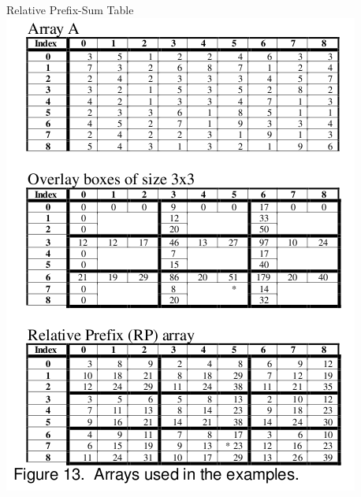 \documentclass{beamer}
\theoremstyle{definition}
\theoremstyle{definition}
\begin{document}
\begin{frame}{Relative Prefix-Sum Table}
\includegraphics[scale=0.35]{relprefix_tables.png}
\cite{Geffner99}
\end{frame}
\end{document}
